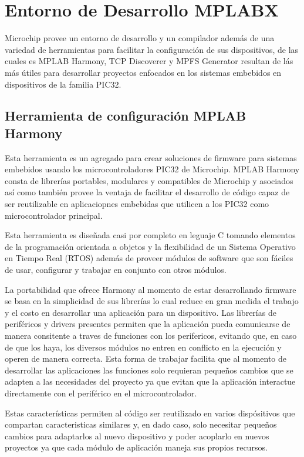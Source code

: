\documentclass[letterpaper,12pt,oneside]{book}
\begin{document}
		\section{Entorno de Desarrollo MPLABX}
		Microchip provee un entorno de desarrollo y un compilador además de una variedad de herramientas para facilitar la configuración de sus dispositivos, de las cuales es MPLAB Harmony, TCP Discoverer y MPFS Generator resultan de lás más útiles para desarrollar proyectos enfocados en los sistemas embebidos en dispositivos de la familia PIC32.

			\subsection{Herramienta de configuración MPLAB Harmony}
			Esta herramienta es un agregado para crear soluciones de firmware para sistemas embebidos usando los microcontroladores PIC32 de Microchip. MPLAB Harmony consta de librerías portables, modulares y compatibles de Microchip y asociados así como también provee la ventaja de facilitar el desarrollo de código capaz de ser reutilizable en aplicaciopnes embebidas que utilicen a los PIC32 como microcontrolador principal.

			Esta herramienta es diseñada casi por completo en leguaje C tomando elementos de la programación orientada a objetos y la flexibilidad de un Sistema Operativo en Tiempo Real (RTOS) además de proveer módulos de software que son fáciles de usar, configurar y trabajar en conjunto con otros módulos.

			La portabilidad que ofrece Harmony al momento de estar desarrollando firmware se basa en la simplicidad de sus librerías lo cual reduce en gran medida el trabajo y el costo en desarrollar una aplicación para un dispositivo. Las librerías de periféricos y drivers presentes permiten que la aplicación pueda comunicarse de manera consitente a traves de funciones con los perifericos, evitando que, en caso de que los haya, los diversos módulos no entren en conflicto en la ejecución y operen de manera correcta. Esta forma de trabajar facilita que al momento de desarrollar las aplicaciones las funciones solo requieran pequeños cambios que se adapten a las necesidades del proyecto ya que evitan que la aplicación interactue directamente con el periférico en el microcontrolador.

			Estas características permiten al código ser reutilizado en varios dispósitivos que compartan caracteristicas similares y, en dado caso, solo necesitar pequeños cambios para adaptarlos al nuevo dispositivo y poder acoplarlo en nuevos proyectos ya que cada módulo de aplicación maneja sus propios recursos.
\end{document}
